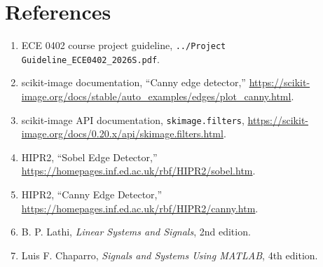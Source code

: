 \documentclass[11pt]{article}
\begin{document}
\section{References}
\begin{enumerate}[leftmargin=1.4em]
  \item ECE 0402 course project guideline, \texttt{../Project Guideline\_ECE0402\_2026S.pdf}.
  \item scikit-image documentation, ``Canny edge detector,'' \url{https://scikit-image.org/docs/stable/auto_examples/edges/plot_canny.html}.
  \item scikit-image API documentation, \texttt{skimage.filters}, \url{https://scikit-image.org/docs/0.20.x/api/skimage.filters.html}.
  \item HIPR2, ``Sobel Edge Detector,'' \url{https://homepages.inf.ed.ac.uk/rbf/HIPR2/sobel.htm}.
  \item HIPR2, ``Canny Edge Detector,'' \url{https://homepages.inf.ed.ac.uk/rbf/HIPR2/canny.htm}.
  \item B. P. Lathi, \textit{Linear Systems and Signals}, 2nd edition.
  \item Luis F. Chaparro, \textit{Signals and Systems Using MATLAB}, 4th edition.
\end{enumerate}
\end{document}
